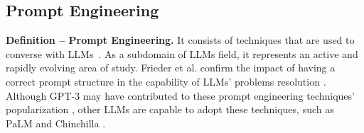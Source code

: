 \subsection{Prompt Engineering}


\textbf{Definition -- Prompt Engineering.} It consists of techniques that are used to converse with LLMs~\cite{velasquez2023prompt}. As a subdomain of LLMs field, it represents an active and rapidly evolving area of study. Frieder et al. confirm the impact of having a correct prompt structure in the capability of LLMs' problems resolution \cite{10.5555/3666122.3667327}. 
Although GPT-3 may have contributed to these prompt engineering techniques' popularization \cite{10.5555/3495724.3495883}, other LLMs are capable to adopt these techniques, such as PaLM \cite{10.5555/3648699.3648939} and Chinchilla \cite{10.5555/3600270.3602446}.

